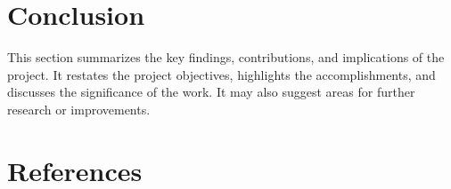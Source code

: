 \documentclass[journal]{IEEEtran}
\begin{document}
	\section{Conclusion}
	\label{sec:conclusion}
	This section summarizes the key findings, contributions, and implications of the project. It restates the project objectives, highlights the accomplishments, and discusses the significance of the work. It may also suggest areas for further research or improvements.
	
	\section*{References}
	\label{sec:references}
	
	
\end{document}
